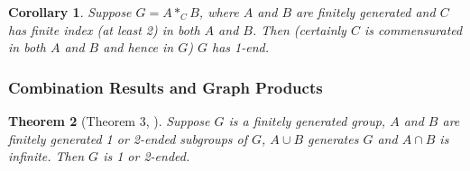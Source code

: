 \documentclass[12pt]{article}
\newtheorem{theorem}{Theorem}[subsection]
\newtheorem{corollary}[theorem]{Corollary}
\begin{document}
\begin{corollary}\label{FIcomm} 
Suppose $G=A\ast_C B$, where $A$ and $B$ are finitely generated and $C$ has finite index (at least 2) in both $A$ and $B$. Then (certainly $C$ is commensurated in both $A$ and $B$ and hence in $G$) $G$ has 1-end.
\end{corollary}

\subsubsection{Combination Results and Graph Products}\label{compGP} 
  
 \begin{theorem} [Theorem 3, \cite{M4}] \label{combE}  
Suppose $G$ is a finitely generated group, $A$ and $B$ are finitely generated 1 or 2-ended subgroups of $G$, $A\cup B$ generates $G$ and $A\cap B$ is infinite. Then $G$ is 1 or 2-ended.
\end{theorem}
\end{document}
